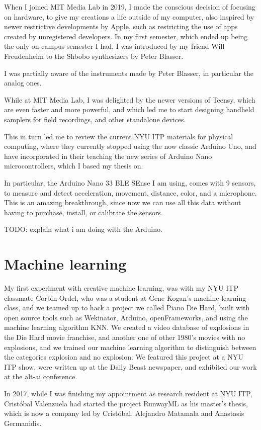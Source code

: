 When I joined MIT Media Lab in 2019, I made the conscious decision of focusing on hardware, to give my creations a life outside of my computer, also inspired by newer restrictive developments by Apple, such as restricting the use of apps created by unregistered developers. In my first semester, which ended up being the only on-campus semester I had, I was introduced by my friend Will Freudenheim to the Shbobo synthesizers by Peter Blasser.

I was partially aware of the instruments made by Peter Blasser, in particular the analog ones.

While at MIT Media Lab, I was delighted by the newer versions of Teensy, which are even faster and more powerful, and which led me to start designing handheld samplers for field recordings, and other standalone devices.

This in turn led me to review the current NYU ITP materials for physical computing, where they currently stopped using the now classic Arduino Uno, and have incorporated in their teaching the new series of Arduino Nano microcontrollers, which I based my thesis on.

In particular, the Arduino Nano 33 BLE SEnse I am using, comes with 9 sensors, to measure and detect acceleration, movement, distance, color, and a microphone. This is an amazing breakthrough, since now we can use all this data without having to purchase, install, or calibrate the sensors.

TODO: explain what i am doing with the Arduino.

\section{Machine learning}

My first experiment with creative machine learning, was with my NYU ITP classmate Corbin Ordel, who was a student at Gene Kogan's machine learning class, and we teamed up to hack a project we called Piano Die Hard, built with open source tools such as Wekinator, Arduino, openFrameworks, and using the machine learning algorithm KNN. We created a video database of explosions in the Die Hard movie franchise, and another one of other 1980's movies with no explosions, and we trained our machine learning algorithm to distinguish between the categories explosion and no explosion. We featured this project at a NYU ITP show, were written up at the Daily Beast newspaper, and exhibited our work at the alt-ai conference.

In 2017, while I was finishing my appointment as research resident at NYU ITP, Cristóbal Valenzuela had started the project RunwayML as his master's thesis, which is now a company led by Cristóbal, Alejandro Matamala and Anastasis Germanidis.

